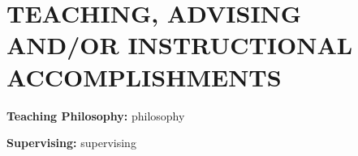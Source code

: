 \section{TEACHING, ADVISING AND/OR INSTRUCTIONAL ACCOMPLISHMENTS}
\textbf{Teaching Philosophy:} {{philosophy}}

\noindent \textbf{Supervising:} {{supervising}}

